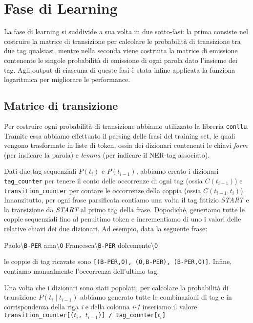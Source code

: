 \chapter{Fase di Learning}
La fase di learning si suddivide a sua volta in due sotto-fasi: la prima consiste nel costruire la matrice di transizione per calcolare le probabilità di transizione tra due tag qualsiasi, mentre nella seconda viene costruita la matrice di emissione contenente le singole probabilità di emissione di ogni parola dato l'insieme dei tag. Agli output di ciascuna di queste fasi è stata infine applicata la funziona logaritmica per migliorare le performance.

\section{Matrice di transizione}
Per costruire ogni probabilità di transizione abbiamo utilizzato la libreria \texttt{conllu}. Tramite essa abbiamo effettuato il parsing delle frasi del training set, le quali vengono trasformate in liste di token, ossia dei dizionari contenenti le chiavi \textit{form} (per indicare la parola) e \textit{lemma} (per indicare il NER-tag associato).

Dati due tag sequenziali $P(t_i)$ e $P(t_{i-1})$, abbiamo creato i dizionari \texttt{tag\_counter} per tenere il conto delle occorrenze di ogni tag (ossia $C(t_{i-1})$) e \texttt{transition\_counter} per contare le occorrenze della coppia (ossia $C(t_{i-1},t_i)$).
Innanzitutto, per ogni frase parsificata contiamo una volta il tag fittizio \textit{START} e la transizione da \textit{START} al primo tag della frase.
Dopodiché, generiamo tutte le coppie sequenziali fino al penultimo token e incrementiamo di uno i valori delle relative chiavi dei due dizionari. Ad esempio, data la seguente frase:
\begin{center}
    Paolo\textbackslash \texttt{B-PER} ama\textbackslash \texttt{O} Francesca\textbackslash \texttt{B-PER} dolcemente\textbackslash \texttt{O}
\end{center}
le coppie di tag ricavate sono \texttt{[(B-PER,O), (O,B-PER), (B-PER,O)]}.
Infine, contiamo manualmente l'occorrenza dell'ultimo tag.

Una volta che i dizionari sono stati popolati, per calcolare la probabilità di transizione $P(t_i \mid t_{i-1})$ abbiamo generato tutte le combinazioni di tag e in corrispondenza della riga \textit{i} e della colonna \textit{i-1} inseriamo il valore \texttt{transition\_counter[($t_i$, $t_{i-1}$)] / tag\_counter[$t_i$]}

